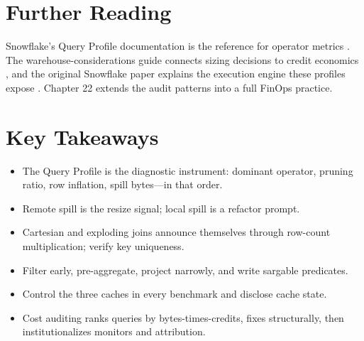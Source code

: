 \section{Further Reading}
Snowflake's Query Profile documentation is the reference for operator metrics \cite{snowflakeQueryProfileDocs}. The warehouse-considerations guide connects sizing decisions to credit economics \cite{snowflakeWarehouseConsiderationsDocs}, and the original Snowflake paper explains the execution engine these profiles expose \cite{dageville2016snowflake}. Chapter 22 extends the audit patterns into a full FinOps practice.

\section*{Key Takeaways}
\begin{itemize}
    \item The Query Profile is the diagnostic instrument: dominant operator, pruning ratio, row inflation, spill bytes---in that order.
    \item Remote spill is the resize signal; local spill is a refactor prompt.
    \item Cartesian and exploding joins announce themselves through row-count multiplication; verify key uniqueness.
    \item Filter early, pre-aggregate, project narrowly, and write sargable predicates.
    \item Control the three caches in every benchmark and disclose cache state.
    \item Cost auditing ranks queries by bytes-times-credits, fixes structurally, then institutionalizes monitors and attribution.
\end{itemize}


